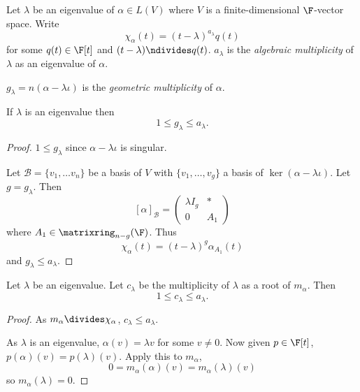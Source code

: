 \documentclass[a4paper]{article}
\newcommand*{\M}{\matrixring}
\newcommand*{\basis}{\mathcal}
\theoremstyle{definition}
\begin{document}
\begin{definition}
  Let \(\lambda\) be an eigenvalue of \(\alpha \in L(V)\) where \(V\) is a finite-dimensional \(\F\)-vector space. Write
  \[
    \chi_\alpha(t) = (t - \lambda)^{a_\lambda} q(t)
  \]
  for some \(q(t) \in \F[t]\) and \((t - \lambda) \ndivides q(t)\). \(a_\lambda\) is the \emph{algebraic multiplicity} of \(\lambda\) as an eigenvalue of \(\alpha\).
\end{definition}

\begin{definition}
  \(g_\lambda = n(\alpha - \lambda \iota)\) is the \emph{geometric multiplicity} of \(\alpha\).
\end{definition}

\begin{lemma}
  If \(\lambda\) is an eigenvalue then
  \[
    1 \leq g_\lambda \leq a_\lambda.
  \]
\end{lemma}

\begin{proof}
  \(1 \leq g_\lambda\) since \(\alpha - \lambda \iota\) is singular.

  Let \(\basis B = \{v_1, \dots v_n\}\) be a basis of \(V\) with \(\{v_1, \dots, v_g\}\) a basis of \(\ker(\alpha - \lambda \iota)\). Let \(g = g_\lambda\). Then
  \[
    [\alpha]_{\basis B} =
    \begin{pmatrix}
      \lambda I_g & * \\
      0 & A_1
    \end{pmatrix}
  \]
  where \(A_1 \in \M_{n - g}(\F)\). Thus
  \[
    \chi_\alpha(t) = (t - \lambda)^g \alpha_{A_1}(t)
  \]
  and \(g_\lambda \leq a_\lambda\).
\end{proof}

\begin{lemma}
  Let \(\lambda\) be an eigenvalue. Let \(c_\lambda\) be the multiplicity of \(\lambda\) as a root of \(m_\alpha\). Then
  \[
    1 \leq c_\lambda \leq a_\lambda.
  \]
\end{lemma}

\begin{proof}
  As \(m_\alpha \divides \chi_\alpha\), \(c_\lambda \leq a_\lambda\).

  As \(\lambda\) is an eigenvalue, \(\alpha(v) = \lambda v\) for some \(v \neq 0\). Now given \(p \in \F[t]\), \(p(\alpha)(v) = p(\lambda)(v)\). Apply this to \(m_\alpha\),
  \[
    0 = m_\alpha(\alpha)(v) = m_\alpha(\lambda)(v)
  \]
  so \(m_\alpha(\lambda) = 0\).
\end{proof}
\end{document}
